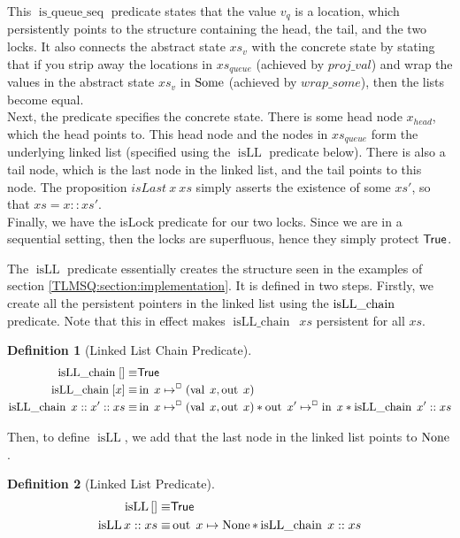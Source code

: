 \documentclass[a4paper, 11pt]{report}
\newtheorem{definition}{Definition}[section]
\newcommand{\isqueueseq}{\operatorname{is\_queue\_seq}}
\newcommand{\isLLchain}[1]{\operatorname{isLL\_chain} \; #1}
\newcommand{\isLL}{\operatorname{isLL}}
\newcommand{\nIn}[1]{\operatorname{in} \; #1}
\newcommand{\nVal}[1]{\operatorname{val} \; #1}
\newcommand{\nOut}[1]{\operatorname{out} \; #1}
\begin{document}
This $\isqueueseq$ predicate states that the value $v_q$ is a location, which persistently points to the structure containing the head, the tail, and the two locks. It also connects the abstract state $xs_v$ with the concrete state by stating that if you strip away the locations in $xs_{queue}$ (achieved by $proj\_val$) and wrap the values in the abstract state $xs_v$ in $\operatorname{Some}$ (achieved by $wrap\_some$), then the lists become equal.\\
Next, the predicate specifies the concrete state. There is some head node $x_{head}$, which the head points to. This head node and the nodes in $xs_{queue}$ form the underlying linked list (specified using the $\isLL$ predicate below). There is also a tail node, which is the last node in the linked list, and the tail points to this node. The proposition $isLast\ x\ xs$ simply asserts the existence of some $xs'$, so that $xs = x :: xs'$.\\
Finally, we have the isLock predicate for our two locks. Since we are in a sequential setting, then the locks are superfluous, hence they simply protect $\textsf{True}$.

The $\isLL$ predicate essentially creates the structure seen in the examples of section \ref{TLMSQ:section:implementation}. It is defined in two steps. Firstly, we create all the persistent pointers in the linked list using the $\isLLchain$ predicate. Note that this in effect makes $\isLLchain \ xs$ persistent for all $xs$.
\begin{definition}[Linked List Chain Predicate]
  \begin{align*}
    \isLLchain{[]} \equiv& \TRUE\\
    \isLLchain{[x]} \equiv& \nIn{x} \mapsto^{\persistently} (\nVal{x}, \nOut{x})\\
    \isLLchain{x :: x' :: xs} \equiv& \nIn{x} \mapsto^{\persistently} (\nVal{x}, \nOut{x}) \star \nOut{x'} \mapsto^{\persistently} \nIn{x} \star \isLLchain{x' :: xs}
  \end{align*}
\end{definition}

Then, to define $\isLL$, we add that the last node in the linked list points to $\operatorname{None}$.
\begin{definition}[Linked List Predicate]
  \begin{align*}
    \isLL{[]} \equiv& \TRUE\\
    \isLL{x :: xs} \equiv& \nOut{x} \mapsto \None \star \isLLchain{x :: xs}
  \end{align*}
\end{definition}
\end{document}
